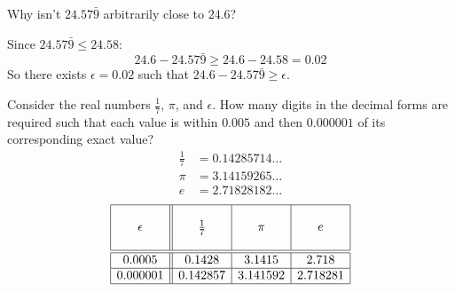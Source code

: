 \documentclass[letterpaper,12pt,fleqn]{article}
\newcommand{\e}{\epsilon}
\begin{document}
\begin{example}
  Why isn't \(24.57\bar{9}\) arbitrarily close to \(24.6\)?

  Since \(24.57\bar{9}\le24.58\):
  \[24.6-24.57\bar{9}\ge24.6-24.58=0.02\]
  So there exists \(\e=0.02\) such that \(24.6-24.57\bar{9}\ge\e\).
\end{example}

\begin{example}
  Consider the real numbers \(\frac{1}{7}\), \(\pi\), and \(\e\).  How many digits in the decimal forms are required
  such that each value is within \(0.005\) and then \(0.000001\) of its corresponding exact value?
  \begin{align*}
    \frac{1}{7} &= 0.14285714\ldots \\
    \pi &= 3.14159265\ldots \\
    e &= 2.71828182\ldots
  \end{align*}
  \[\begin{array}{|c||c|c|c|}
  \hline
  & & & \\
  \e & \frac{1}{7} & \pi & e \\
  & & & \\
  \hline
  \hline
  0.0005 & 0.1428 & 3.1415 & 2.718 \\
  \hline
  0.000001 & 0.142857 & 3.141592 & 2.718281 \\
  \hline
  \end{array}\]
\end{example}
\end{document}
